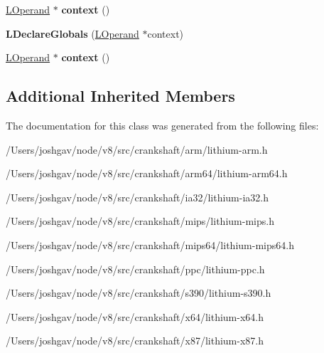 \begin{DoxyCompactItemize}
\item 
\hyperlink{classv8_1_1internal_1_1_l_operand}{L\+Operand} $\ast$ {\bfseries context} ()\hypertarget{classv8_1_1internal_1_1_l_declare_globals_a7d2491fa8cf138ab4136b7188d9e5883}{}\label{classv8_1_1internal_1_1_l_declare_globals_a7d2491fa8cf138ab4136b7188d9e5883}

\item 
{\bfseries L\+Declare\+Globals} (\hyperlink{classv8_1_1internal_1_1_l_operand}{L\+Operand} $\ast$context)\hypertarget{classv8_1_1internal_1_1_l_declare_globals_a849b1061a5251a56bc1e8e5a825aa43c}{}\label{classv8_1_1internal_1_1_l_declare_globals_a849b1061a5251a56bc1e8e5a825aa43c}

\item 
\hyperlink{classv8_1_1internal_1_1_l_operand}{L\+Operand} $\ast$ {\bfseries context} ()\hypertarget{classv8_1_1internal_1_1_l_declare_globals_a7d2491fa8cf138ab4136b7188d9e5883}{}\label{classv8_1_1internal_1_1_l_declare_globals_a7d2491fa8cf138ab4136b7188d9e5883}

\end{DoxyCompactItemize}
\subsection*{Additional Inherited Members}


The documentation for this class was generated from the following files\+:\begin{DoxyCompactItemize}
\item 
/\+Users/joshgav/node/v8/src/crankshaft/arm/lithium-\/arm.\+h\item 
/\+Users/joshgav/node/v8/src/crankshaft/arm64/lithium-\/arm64.\+h\item 
/\+Users/joshgav/node/v8/src/crankshaft/ia32/lithium-\/ia32.\+h\item 
/\+Users/joshgav/node/v8/src/crankshaft/mips/lithium-\/mips.\+h\item 
/\+Users/joshgav/node/v8/src/crankshaft/mips64/lithium-\/mips64.\+h\item 
/\+Users/joshgav/node/v8/src/crankshaft/ppc/lithium-\/ppc.\+h\item 
/\+Users/joshgav/node/v8/src/crankshaft/s390/lithium-\/s390.\+h\item 
/\+Users/joshgav/node/v8/src/crankshaft/x64/lithium-\/x64.\+h\item 
/\+Users/joshgav/node/v8/src/crankshaft/x87/lithium-\/x87.\+h\end{DoxyCompactItemize}
